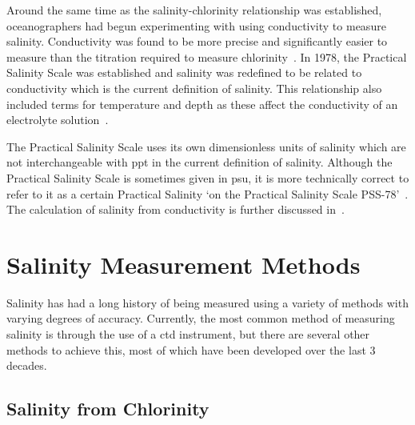 Around the same time as the salinity-chlorinity relationship was established, oceanographers had begun experimenting with using conductivity to measure salinity.
Conductivity was found to be more precise and significantly easier to measure than the titration required to measure chlorinity~\cite{lewis_salinity_definition_and_calculation_1978}.
In 1978, the Practical Salinity Scale was established and salinity was redefined to be related to conductivity which is the current definition of salinity\cite{lewis_salinity_definition_and_calculation_1978}.
This relationship also included terms for temperature and depth as these affect the conductivity of an electrolyte solution~\cite{zheng_electrical_conductivity_of_ocean_2017}.

The Practical Salinity Scale uses its own dimensionless units of salinity which are not interchangeable with \gls{ppt} in the current definition of salinity.
Although the Practical Salinity Scale is sometimes given in \gls{psu}, it is more technically correct to refer to it as a certain Practical Salinity `on the Practical Salinity Scale PSS-78'~\cite{lewis_salinity_definition_and_calculation_1978}.
The calculation of salinity from conductivity is further discussed in~.


\section{Salinity Measurement Methods}\label{sec:salinity-measurement-techniques}


Salinity has had a long history of being measured using a variety of methods with varying degrees of accuracy.
Currently, the most common method of measuring salinity is through the use of a \gls{ctd} instrument, but there are several other methods to achieve this, most of which have been developed over the last 3 decades.

\subsection{Salinity from Chlorinity}\label{subsec:salinity-from-chlorinity}

